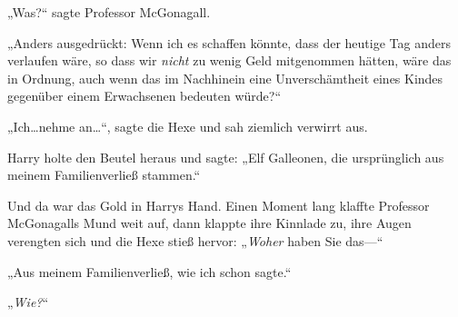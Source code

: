 „Was?“ sagte Professor McGonagall.

„Anders ausgedrückt: Wenn ich es schaffen könnte, dass der heutige Tag anders verlaufen wäre, so dass wir \emph{nicht} zu wenig Geld mitgenommen hätten, wäre das in Ordnung, auch wenn das im Nachhinein eine Unverschämtheit eines Kindes gegenüber einem Erwachsenen bedeuten würde?“

„Ich…nehme an…“, sagte die Hexe und sah ziemlich verwirrt aus.

Harry holte den Beutel heraus und sagte: „Elf Galleonen, die ursprünglich aus meinem Familienverließ stammen.“

Und da war das Gold in Harrys Hand. Einen Moment lang klaffte Professor McGonagalls Mund weit auf, dann klappte ihre Kinnlade zu, ihre Augen verengten sich und die Hexe stieß hervor: „\emph{Woher} haben Sie das—“




„Aus meinem Familienverließ, wie ich schon sagte.“

„\emph{Wie?}“

